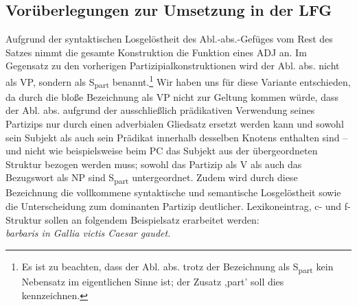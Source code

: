 \documentclass[12pt,a4paper]{article}
\begin{document}
\subsection{Vorüberlegungen zur Umsetzung in der LFG}
Aufgrund der syntaktischen Losgelöstheit des Abl.-abs.-Gefüges vom Rest des Satzes nimmt die gesamte Konstruktion die Funktion eines ADJ an. Im Gegensatz zu den vorherigen Partizipialkonstruktionen wird der Abl. abs. nicht als VP, sondern als S\textsubscript{part} benannt.\footnote{Es ist zu beachten, dass der Abl. abs. trotz der Bezeichnung als S\textsubscript{part} kein Nebensatz im eigentlichen Sinne ist; der Zusatz ,part' soll dies kennzeichnen.}
Wir haben uns für diese Variante entschieden, da durch die bloße Bezeichnung als VP nicht zur Geltung kommen würde, dass der Abl. abs. aufgrund der ausschließlich prädikativen Verwendung seines Partizips nur durch einen adverbialen Gliedsatz ersetzt werden kann und sowohl sein Subjekt als auch sein Prädikat innerhalb desselben Knotens enthalten sind -- und nicht wie beispielsweise beim PC das Subjekt aus der übergeordneten Struktur bezogen werden muss; sowohl das Partizip als V als auch das Bezugswort als NP sind S\textsubscript{part} untergeordnet. Zudem wird durch diese Bezeichnung die vollkommene syntaktische und semantische Losgelöstheit sowie die Unterscheidung zum dominanten Partizip deutlicher.
Lexikoneintrag, c- und f-Struktur sollen an folgendem Beispielsatz erarbeitet werden: \\ \textit{barbaris in Gallia victis Caesar gaudet.}
\end{document}
